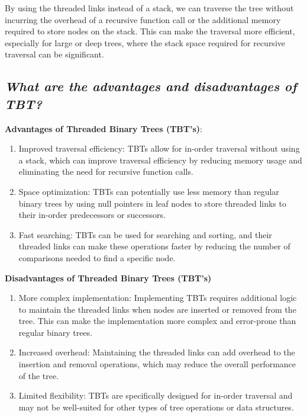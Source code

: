 \documentclass{article}
\begin{document}
By using the threaded links instead of a stack, we can traverse the tree without incurring the overhead of a recursive function call or the additional memory required to store nodes on the stack. This can make the traversal more efficient, especially for large or deep trees, where the stack space required for recursive traversal can be significant.
\subsection{\textit{What are the advantages and disadvantages of TBT?}}
\textbf{Advantages of Threaded Binary Trees (TBT's)}:
\begin{enumerate}
	\item Improved traversal efficiency: TBTs allow for in-order traversal without using a stack, which can improve traversal efficiency by reducing memory usage and eliminating the need for recursive function calls.
	\item Space optimization: TBTs can potentially use less memory than regular binary trees by using null pointers in leaf nodes to store threaded links to their in-order predecessors or successors.
	\item Fast searching: TBTs can be used for searching and sorting, and their threaded links can make these operations faster by reducing the number of comparisons needed to find a specific node.
\end{enumerate}
\textbf{Disadvantages of Threaded Binary Trees (TBT's)}
\begin{enumerate}
	\item More complex implementation: Implementing TBTs requires additional logic to maintain the threaded links when nodes are inserted or removed from the tree. This can make the implementation more complex and error-prone than regular binary trees.
	\item Increased overhead: Maintaining the threaded links can add overhead to the insertion and removal operations, which may reduce the overall performance of the tree.
	\item Limited flexibility: TBTs are specifically designed for in-order traversal and may not be well-suited for other types of tree operations or data structures.
\end{enumerate}
\end{document}
